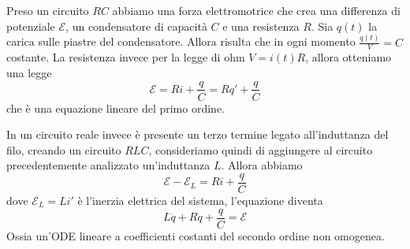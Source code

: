 \begin{example}
    Preso un circuito \(RC\) abbiamo una forza elettromotrice che crea una
    differenza di potenziale \(\mathcal{E}\), un condensatore
    di capacità \(C\) e una resistenza \(R\). Sia \(q(t)\) la carica sulle
    piastre del condensatore. Allora risulta che in ogni momento
    \(\frac{q(t)}{V} = C\) costante. La resistenza invece per la legge di ohm
    \(V = i(t)R\), allora otteniamo una legge
    \[
       \mathcal{E} = Ri + \frac{q}{C} = Rq' + \frac{q}{C} 
    \]
    che è una equazione lineare del primo ordine.

    In un circuito reale invece è presente un terzo termine legato
    all'induttanza del filo, creando un circuito \(RLC\), consideriamo quindi di
    aggiungere al circuito precedentemente analizzato un'induttanza \(L\).
    Allora abbiamo
    \[
        \mathcal{E} - \mathcal{E}_L = Ri + \frac{q}{C}
    \]
    dove \(\mathcal{E}_L = Li'\) è l'inerzia elettrica del sistema, l'equazione
    diventa
    \[
        L\ddot{q} + R\dot{q} + \frac{q}{C} = \mathcal{E}
    \]
    Ossia un'ODE lineare a coefficienti costanti del secondo ordine non omogenea.
\end{example}

